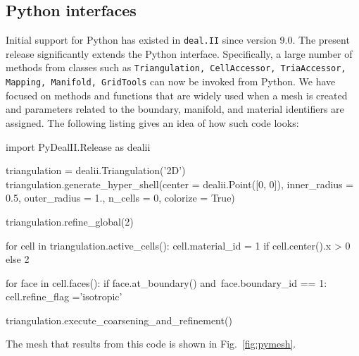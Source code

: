 \documentclass{ansarticle-preprint}
\newcommand{\specialword}[1]{\texttt{#1}}
\newcommand{\dealii}{{\specialword{deal.II}}\xspace}
\begin{document}

\subsection{Python interfaces}
\label{subsec:python}

Initial support for Python has existed in \dealii{} since version
9.0. The present release significantly extends the Python
interface. Specifically, a large number of methods from classes such
as \texttt{Triangulation, CellAccessor, TriaAccessor, Mapping,
  Manifold, GridTools} can now be invoked from Python. We have focused
on methods and functions that are widely used when a mesh is created
and parameters related to the boundary, manifold, and material
identifiers are assigned. The following listing gives an idea of how
such code looks:
\begin{python}
import PyDealII.Release as dealii

triangulation = dealii.Triangulation('2D')
triangulation.generate_hyper_shell(center = dealii.Point([0, 0]),
                    inner_radius = 0.5, outer_radius = 1.,
                    n_cells = 0, colorize = True)

triangulation.refine_global(2)

for cell in triangulation.active_cells():
    cell.material_id = 1 if cell.center().x > 0 else 2

    for face in cell.faces():
        if face.at_boundary() and\
           face.boundary_id == 1:
            cell.refine_flag ='isotropic'

triangulation.execute_coarsening_and_refinement()
\end{python}
The mesh that results from this code is shown in Fig.~\ref{fig:pymesh}.
\end{document}
